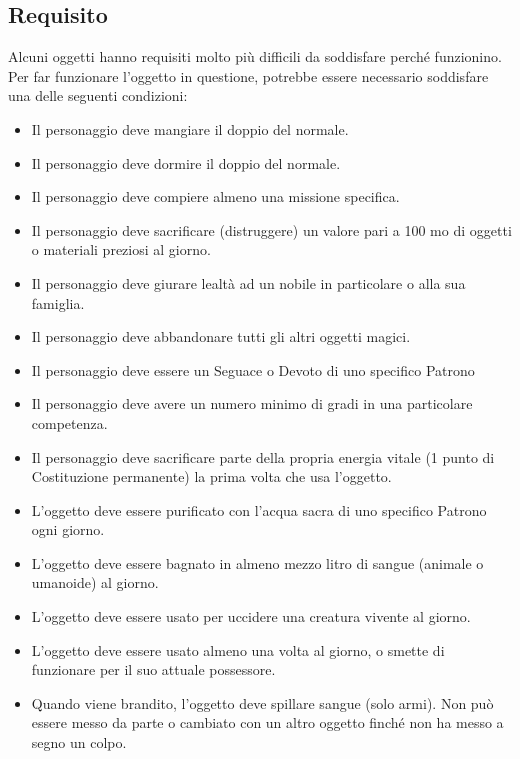 \begin{multicols}{2}
	\subsection{Requisito}

	Alcuni oggetti hanno requisiti molto più difficili da soddisfare perché funzionino. Per far funzionare l'oggetto in questione, potrebbe essere necessario soddisfare una delle seguenti condizioni:

	\begin{itemize}
		\item Il personaggio deve mangiare il doppio del normale.
		\item Il personaggio deve dormire il doppio del normale.
		\item Il personaggio deve compiere almeno una missione specifica.
		\item Il personaggio deve sacrificare (distruggere) un valore pari a 100 mo di oggetti o materiali preziosi al giorno.
		\item Il personaggio deve giurare lealtà ad un nobile in particolare o alla sua famiglia.
		\item Il personaggio deve abbandonare tutti gli altri oggetti magici.
		\item Il personaggio deve essere un Seguace o Devoto di uno specifico Patrono
		\item Il personaggio deve avere un numero minimo di gradi in una particolare competenza.
		\item Il personaggio deve sacrificare parte della propria energia vitale (1 punto di Costituzione permanente) la prima volta che usa l'oggetto.
		\item L'oggetto deve essere purificato con l'acqua sacra di uno specifico Patrono ogni giorno.
		\item L'oggetto deve essere bagnato in almeno mezzo litro di sangue (animale o umanoide) al giorno.
		\item L'oggetto deve essere usato per uccidere una creatura vivente al giorno.
		\item L'oggetto deve essere usato almeno una volta al giorno, o smette di funzionare per il suo attuale possessore.
		\item Quando viene brandito, l'oggetto deve spillare sangue (solo armi). Non può essere messo da parte o cambiato con un altro oggetto finché non ha messo a segno un colpo.
	\end{itemize}

	\medskip


\end{multicols}
